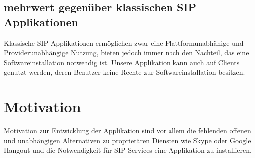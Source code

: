 		\subsection{mehrwert gegenüber klassischen SIP Applikationen}
			Klassische SIP Applikationen ermöglichen zwar eine Plattformunabhänige und Providerunabhängige Nutzung, bieten jedoch immer noch den Nachteil, das eine Softwareinstallation notwendig ist.
			Unsere Applikation kann auch auf Clients genutzt werden, deren Benutzer keine Rechte zur Softwareinstallation besitzen.
			
			
	\section{Motivation}
		Motivation zur Entwicklung der Applikation sind vor allem die fehlenden offenen und unabhängigen Alternativen zu proprietären Diensten wie Skype oder Google Hangout und die Notwendigkeit für SIP Services eine Applikation zu installieren.
		